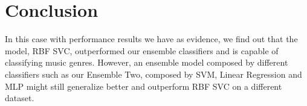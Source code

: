 \section{Conclusion}


In this case with performance results we have as evidence, we find out that the model, RBF SVC, outperformed our ensemble classifiers and is capable of classifying music genres. However, an ensemble model composed by different classifiers such as our Ensemble Two, composed by SVM, Linear Regression and MLP might still generalize better and outperform RBF SVC on a different dataset.

